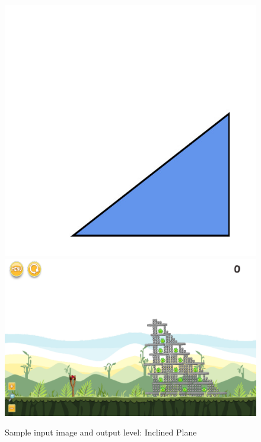 \documentclass{dalthesis}
\begin{document}
\begin{figure}
	\caption{Sample input image and output level: Inclined Plane}
  \includegraphics[width=\textwidth,height=\textheight,keepaspectratio]{levels/pictures/mechanisms/inclined_plane.jpg}
  \includegraphics[width=\textwidth,height=\textheight,keepaspectratio]{levels/screenshots/mechanisms/inclined_plane.png}
\end{figure}
\end{document}
